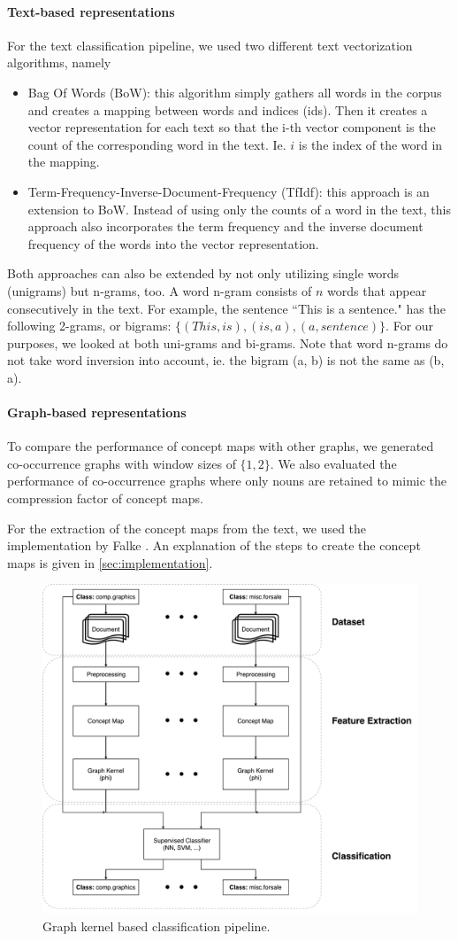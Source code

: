 \paragraph{Text-based representations}
For the text classification pipeline, we used two different text vectorization algorithms, namely
\begin{itemize}
\item{Bag Of Words (BoW): this algorithm simply gathers all words in the corpus and creates a mapping between words and indices (ids). Then it creates a vector representation for each text so that the i-th vector component is the count of the corresponding word in the text. Ie. $i$ is the index of the word in the mapping.}
\item{Term-Frequency-Inverse-Document-Frequency (TfIdf): this approach is an extension to BoW. Instead of using only the counts of a word in the text, this approach also incorporates the term frequency and the inverse document frequency of the words into the vector representation.}
\end{itemize}
Both approaches can also be extended by not only utilizing single words (unigrams) but n-grams, too. A word n-gram consists of $n$ words that appear consecutively in the text.
For example, the sentence ``This is a sentence." has the following 2-grams, or bigrams: $\{ (This, is), (is, a), (a, sentence) \}$.
For our purposes, we looked at both uni-grams and bi-grams.
Note that word n-grams do not take word inversion into account, ie. the bigram (a, b) is not the same as (b, a).

\paragraph{Graph-based representations}
To compare the performance of concept maps with other graphs, we generated co-occurrence graphs with window sizes of $\{1, 2\}$.
We also evaluated the performance of co-occurrence graphs where only nouns are retained to mimic the compression factor of concept maps.

For the extraction of the concept maps from the text, we used the implementation by Falke \cite{Falke2017}.
An explanation of the steps to create the concept maps is given in \ref{sec:implementation}.

\begin{figure}[ht]
\centering\includegraphics[width=0.6\linewidth]{assets/figures/approach.pdf}
\caption{Graph kernel based classification pipeline.}
\end{figure}

